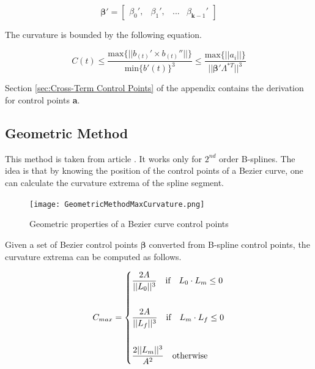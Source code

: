 \documentclass{article}
\begin{document}
\begin{equation}
    \boldsymbol{\beta}' = \begin{bmatrix} \beta_0', & \beta_1', & ... & \beta_{\textbf{k}-1}' \end{bmatrix}
\end{equation}

The curvature is bounded by the following equation.

\begin{equation}
    C(t) \leq \frac{\text{max}\{||b_{(t)}' \times b_{(t)}''||\}}{\text{min}\{b'(t)\}^3} \leq \frac{\text{max}\{||a_i||\}}{||\boldsymbol{\beta}' \Lambda^{*T}||^3}
\end{equation}

Section \ref{sec:Cross-Term Control Points} of the appendix contains the derivation for control points \textbf{a}.

\subsection{Geometric Method}

This method is taken from article \cite{ARTICLE:Deddi}. It works only for \(2^{nd}\) order B-splines. The idea is that by knowing the position of the control points of a Bezier curve, one can calculate the curvature extrema of the spline segment.

\begin{figure}[H]
\begin{center}
\texttt{[image: GeometricMethodMaxCurvature.png]}
\end{center}
\caption{Geometric properties of a Bezier curve control points}
\label{Fig:GeometricMethodMaxCurvature}
\end{figure}

Given a set of Bezier control points \(\boldsymbol{\beta}\) converted from B-spline control points, the curvature extrema can be computed as follows.

\begin{equation}
    C_{max} = \begin{dcases} 
    \frac{2A}{||L_0||^3} \quad \text{if} \quad L_0 \cdot L_m \leq 0 \\\\ 
    \frac{2A}{||L_f||^3} \quad \text{if} \quad L_m \cdot L_f \leq 0 \\\\
    \frac{2||L_m||^3}{A^2} \quad \text{otherwise}
    \end{dcases}
\end{equation}
\end{document}
